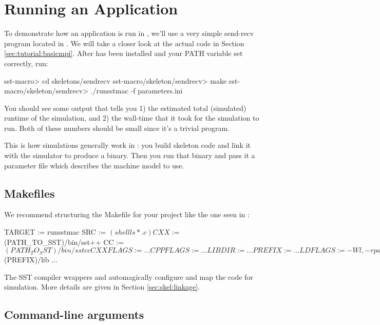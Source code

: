 \section{Running an Application}
\label{sec:tutorial:runapp}

To demonstrate how an application is run in \sstmacro, we'll use a very simple send-recv program located in .
We will take a closer look at the actual code in Section \ref{sec:tutorial:basicmpi}.
After \sstmacro has been installed and your PATH variable set correctly, run: 

\begin{ShellCmd}
sst-macro> cd skeletons/sendrecv
sst-macro/skeleton/sendrecv> make
sst-macro/skeleton/sendrecv> ./runsstmac -f parameters.ini
\end{ShellCmd}

You should see some output that tells you 1) the estimated total (simulated) runtime of the simulation, and 
2) the wall-time that it took for the simulation to run.  
Both of these numbers should be small since it's a trivial program. 

This is how simulations generally work in \sstmacro: you build skeleton code and link it with the simulator to produce a binary.  
Then you run that binary and pass it a parameter file which describes the machine model to use.

\subsection{Makefiles}
\label{subsec:tutorial:makefiles}

We recommend structuring the Makefile for your project like the one seen in  :

\begin{ViFile}
TARGET := runsstmac
SRC := $(shell ls *.c) 

CXX :=      $(PATH_TO_SST)/bin/sst++
CC :=        $(PATH_TO_SST)/bin/sstcc
CXXFLAGS := ...
CPPFLAGS := ...
LIBDIR :=  ...
PREFIX :=   ...
LDFLAGS :=  -Wl,-rpath,$(PREFIX)/lib
...
\end{ViFile}
The SST compiler wrappers  and  automagically configure and map the code for simulation.  More details are given in Section \ref{sec:skel:linkage}.

\subsection{Command-line arguments}
\label{subsec:tutorial:cmdline}

